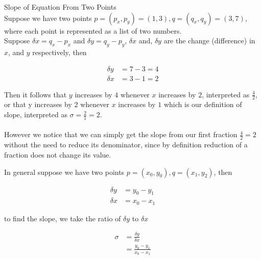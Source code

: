 \documentclass{book}
\begin{document}
  {\example Slope of Equation From Two Points \\
    Suppose we have two points $p = (p_x, p_y) = (1, 3), q = (q_x, q_y) = (3, 7)$, where each point is represented as a list of two numbers.\\

    Suppose $\delta x = q_x - p_x$ and $\delta y = q_y - p_y$, $\delta x$ and, $\delta y$ are the change (difference) in $x$, and $y$ respectively, then

    \begin{align*}
      \delta y & = 7 - 3 = 4\\
      \delta x & = 3 - 1 = 2
    \end{align*}

    Then it follows that $y$ increases by $4$ whenever $x$ increases by $2$, interpreted as $\displaystyle \frac{4}{2}$, or that y increases by $2$ whenever $x$ increases by $1$ which is our definition of slope, interpreted as $\displaystyle \sigma = \frac{2}{1} = 2$.\\\\

    However we notice that we can simply get the slope from our first fraction $\displaystyle \frac{4}{2} = 2$ without the need to reduce its denominator, since by definition reduction of a fraction does not change its value.

    In general suppose we have two points $p = (x_0, y_0), q = (x_1, y_2)$, then

    \begin{align*}
      \delta y & = y_0 - y_1\\
      \delta x & = x_0 - x_1
    \end{align*}

    to find the slope, we take the ratio of $\delta y$ to $\delta x$

    \begin{align*}
      \sigma & = \frac{\delta y}{\delta x}\\
      & = \frac{y_0 - y_1}{x_0 - x_1}
    \end{align*}
  }
\end{document}
